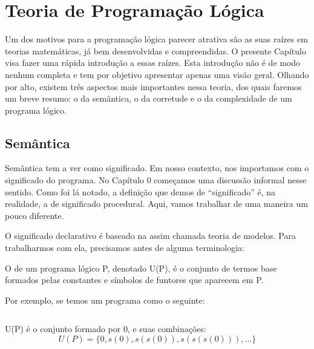 

%
%
%



\section{Teoria de Programação Lógica}

Um dos motivos para a programação lógica parecer atrativa são as suas raízes em teorias matemáticas, já bem desenvolvidas e compreendidas. O presente Capítulo visa fazer uma rápida introdução a essas raízes. Esta introdução não é de modo nenhum completa e tem por objetivo apresentar apenas uma visão geral. Olhando por alto, existem três aspectos mais importantes nessa teoria, dos quais faremos um breve resumo: o da semântica, o da corretude e o da complexidade de um programa lógico.

\subsection{Semântica}
Semântica tem a ver como significado. Em nosso contexto, nos importamos com o significado do programa. No Capítulo 0 %
começamos uma discussão informal nesse sentido. Como foi lá notado, a definição que demos de ``significado'' é, na realidade, a de significado procedural. Aqui, vamos trabalhar de uma maneira um pouco diferente.

O significado declarativo é baseado na assim chamada teoria de modelos. Para trabalharmos com ela, precisamos antes de alguma terminologia:

\begin{definition} O  de um programa lógico P, denotado U(P), é o conjunto de termos base formados pelas constantes e símbolos de funtores que aparecem em P.
\end{definition}

Por exemplo, se temos um programa como o seguinte:

    \begin{listing}
\inputminted{prolog}{../Exemplos/Cap2/prog1_natural.pl}\label{lst:natural}
    \end{listing}

U(P) é o conjunto formado por 0,  e suas combinações:
\[
  U(P) = \{0, s(0), s(s(0)), s(s(s(0))), ...\}
\]

